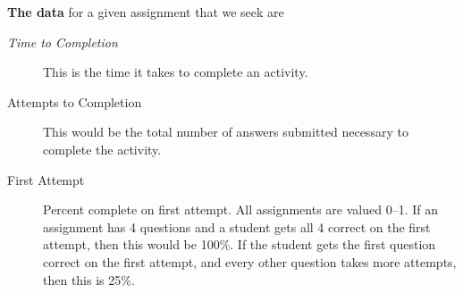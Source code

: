 \documentclass{techbrief}
\begin{document}
\begin{xframe}
    \textbf{The data} for a given assignment that we seek are
    \begin{description}
        \item[\textit{Time to Completion}] This is the time it takes to
            complete an
            activity.
        \item[Attempts to Completion] This would be the total number of answers
            submitted necessary to complete the activity.
        \item[First Attempt] Percent complete on first
            attempt. All assignments are valued
            0--1. If an assignment has 4 questions and a student gets
            all 4 correct on the first attempt, then this would be 100\%. If
            the student gets the first question correct on the first attempt,
            and every other
            question takes more attempts, then this is 25\%.
    \end{description}
\end{xframe}
\end{document}
